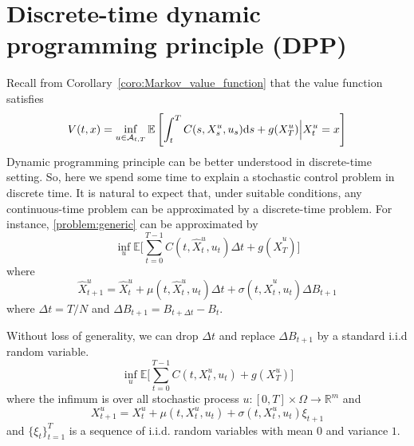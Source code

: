 \documentclass[11pt]{book}
\newcommand{\ds}{\text{\normalfont d}s}
\begin{document}
\section{Discrete-time dynamic programming principle (DPP)}
Recall from Corollary~\ref{coro:Markov_value_function} that the value function satisfies
\begin{equation}\label{eqn:value_function}
    V(t,x) =\inf_{u\in\mathcal{A}_{t,T}}\mathbb{E}\left[\int_{t}^{T}C(s,X_s^u,u_s){{\ds}}+g(X_T^u)\Big|X^u_t=x\right]
\end{equation}
Dynamic programming principle can be better understood in discrete-time setting. So, here we spend some time to explain a stochastic control problem in discrete time. It is natural to expect that, under suitable conditions, any continuous-time problem can be approximated by a discrete-time problem. For instance, \eqref{problem:generic} can be approximated by 
\begin{equation}
    \inf_{u} \mathbb{E}\bigg[\sum_{t=0}^{T-1}C(t,\hat{X}^u_t,u_t)\Delta t+g(\hat{X}^u_T)\bigg]
\end{equation}
where 
\begin{equation}
    \hat{X}^u_{t+1} =\hat{X}^u_t+\mu(t,\hat{X}^u_t,u_t)\Delta t+\sigma(t,\hat{X}^u_t,u_t)\Delta B_{t+1}
\end{equation}
where $\Delta t=T/N$ and $\Delta B_{t+1}=B_{t+\Delta t}-B_{t}$.

Without loss of generality, we can drop $\Delta t$ and replace $\Delta B_{t+1}$ by a standard i.i.d random variable.
\begin{equation}\label{prob:discrete_optimal_control}
    \inf_{u} \mathbb{E}\bigg[\sum_{t=0}^{T-1}C(t,X^u_t,u_t)+g(X^u_T)\bigg]
\end{equation}
where the infimum is over all stochastic process $u:[0,T]\times\Omega\to\mathbb{R}^m$ and 
\begin{equation}
    \label{eqn:discrete_state}
    X^u_{t+1} =X^u_t+\mu(t,X^u_t,u_t)+\sigma(t,X^u_t,u_t)\xi_{t+1}
\end{equation}
and $\{\xi_t\}_{t=1}^T$ is a sequence of i.i.d. random variables with mean $0$ and variance $1$.
\end{document}
